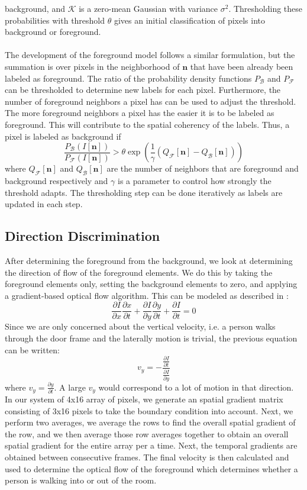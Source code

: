 \documentclass[12pt,oneside]{article} %
\begin{document}
background, and $\mathcal{K}$ is a zero-mean Gaussian with variance $\sigma^2$. Thresholding these probabilities
with threshold $\theta$ gives an initial classification of pixels into background or foreground.
\\ \\
The development of the foreground model follows a similar formulation, but the summation is over
pixels in the neighborhood of $\mathbf{n}$ that have been already been labeled as foreground. The
ratio of the probability density functions $P_\mathcal{B}$ and 
$P_\mathcal{F}$ can be thresholded to determine new labels for each pixel. Furthermore,
the number of foreground neighbors a pixel has can be used to adjust the threshold. The more foreground
neighbors a pixel has the easier it is to be labeled as foreground. This will contribute to the spatial
coherency of the labels. Thus, a pixel is labeled as background if
$$\frac{P_\mathcal{B}(I[\mathbf{n}])}{P_\mathcal{F}(I[\mathbf{n}])} > \theta \exp \left(\frac{1}{\gamma} 
	(Q_\mathcal{F}[\mathbf{n}] - Q_\mathcal{B}[\mathbf{n}] )\right)$$
where $Q_\mathcal{F}[\mathbf{n}]$ and $Q_\mathcal{B}[\mathbf{n}]$ are the number of neighbors that are 
foreground and background respectively and $\gamma$ is a parameter to control how strongly the threshold
adapts. The thresholding step can be done iteratively as labels are updated in each step.

\subsection{Direction Discrimination}
After determining the foreground from the background, we look at determining the direction of flow of the foreground elements. We do this by taking the foreground elements only, setting the background elements to zero, and applying a gradient-based optical flow algorithm. This can be modeled as described in \cite{Smith97}:
$$\frac{\partial I}{\partial x}\frac{\partial x}{\partial t}+\frac{\partial I}{\partial y}\frac{\partial y}{\partial t} + \frac{\partial I}{\partial t}=0$$
Since we are only concerned about the vertical velocity, i.e. a person walks through the door frame and the laterally motion is trivial, the previous equation can be written: 
$$v_y = - \frac{\frac{\partial I}{\partial t}}{\frac{\partial I}{\partial y}}$$
where $v_y =  \frac{\partial y}{\partial t}$. A large $v_y $ would correspond to a lot of motion in that direction. In our system of 4x16 array of pixels, we generate an spatial gradient matrix consisting of 3x16 pixels to take the boundary condition into account. Next, we perform two averages, we average the rows to find the overall spatial gradient of the row, and we then average those row averages together to obtain an overall spatial gradient for the entire array per a time. Next, the temporal gradients are obtained between consecutive frames. The final velocity is then calculated and used to determine the optical flow of the foreground which determines whether a person is walking into or out of the room. 
\end{document}
